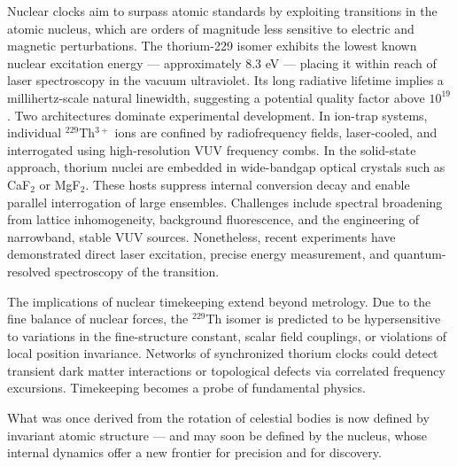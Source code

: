 Nuclear clocks aim to surpass atomic standards by exploiting transitions in the atomic nucleus, which are orders of magnitude less sensitive to electric and magnetic perturbations. The thorium-229 isomer exhibits the lowest known nuclear excitation energy — approximately 8.3 eV — placing it within reach of laser spectroscopy in the vacuum ultraviolet. Its long radiative lifetime implies a millihertz-scale natural linewidth, suggesting a potential quality factor above $10^{19}$. Two architectures dominate experimental development. In ion-trap systems, individual $^{229}$Th$^{3+}$ ions are confined by radiofrequency fields, laser-cooled, and interrogated using high-resolution VUV frequency combs. In the solid-state approach, thorium nuclei are embedded in wide-bandgap optical crystals such as CaF$_2$ or MgF$_2$. These hosts suppress internal conversion decay and enable parallel interrogation of large ensembles. Challenges include spectral broadening from lattice inhomogeneity, background fluorescence, and the engineering of narrowband, stable VUV sources. Nonetheless, recent experiments have demonstrated direct laser excitation, precise energy measurement, and quantum-resolved spectroscopy of the transition.

The implications of nuclear timekeeping extend beyond metrology. Due to the fine balance of nuclear forces, the $^{229}$Th isomer is predicted to be hypersensitive to variations in the fine-structure constant, scalar field couplings, or violations of local position invariance. Networks of synchronized thorium clocks could detect transient dark matter interactions or topological defects via correlated frequency excursions. Timekeeping becomes a probe of fundamental physics.

What was once derived from the rotation of celestial bodies is now defined by invariant atomic structure — and may soon be defined by the nucleus, whose internal dynamics offer a new frontier for precision and for discovery.
